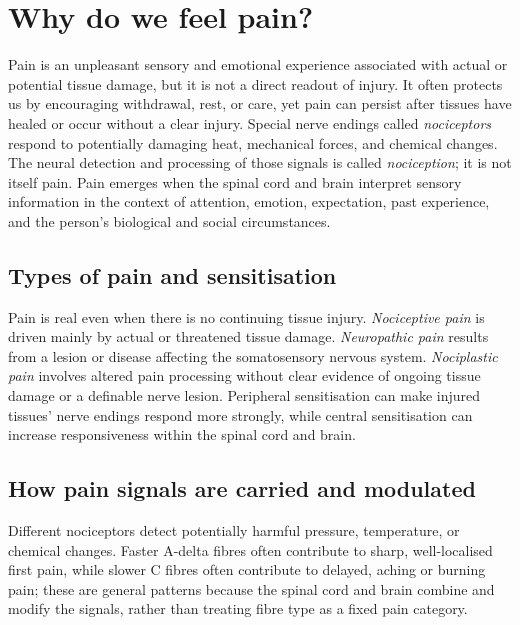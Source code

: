 \documentclass[11pt,oneside]{report}
\begin{document}
\section{Why do we feel pain?}

Pain is an unpleasant sensory and emotional experience associated with actual or
potential tissue damage, but it is not a direct readout of injury. It often
protects us by encouraging withdrawal, rest, or care, yet pain can persist after
tissues have healed or occur without a clear injury. Special nerve endings
called \emph{nociceptors} respond to potentially damaging heat, mechanical
forces, and chemical changes. The neural detection and processing of those
signals is called \emph{nociception}; it is not itself pain. Pain emerges when
the spinal cord and brain interpret sensory information in the context of
attention, emotion, expectation, past experience, and the person's biological
and social circumstances.

\subsection*{Types of pain and sensitisation}

Pain is real even when there is no continuing tissue injury. \emph{Nociceptive
pain} is driven mainly by actual or threatened tissue damage. \emph{Neuropathic
pain} results from a lesion or disease affecting the somatosensory nervous
system. \emph{Nociplastic pain} involves altered pain processing without clear
evidence of ongoing tissue damage or a definable nerve lesion. Peripheral
sensitisation can make injured tissues' nerve endings respond more strongly,
while central sensitisation can increase responsiveness within the spinal cord
and brain.

\subsection*{How pain signals are carried and modulated}

Different nociceptors detect potentially harmful pressure, temperature, or
chemical changes. Faster A-delta fibres often contribute to sharp,
well-localised first pain, while slower C fibres often contribute to delayed,
aching or burning pain; these are general patterns because the spinal cord and
brain combine and modify the signals, rather than treating fibre type as a
fixed pain category.
\end{document}
